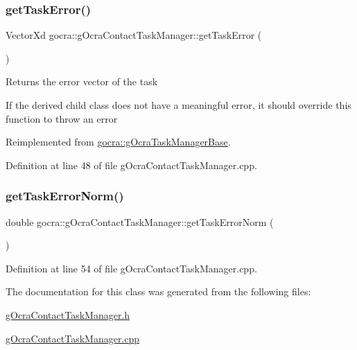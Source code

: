 \subsubsection{\texorpdfstring{get\+Task\+Error()}{getTaskError()}}
{\footnotesize\ttfamily Vector\+Xd gocra\+::g\+Ocra\+Contact\+Task\+Manager\+::get\+Task\+Error (\begin{DoxyParamCaption}{ }\end{DoxyParamCaption})\hspace{0.3cm}{\ttfamily [virtual]}}

Returns the error vector of the task

If the derived child class does not have a meaningful error, it should override this function to throw an error 

Reimplemented from \hyperlink{classgocra_1_1gOcraTaskManagerBase_a5c40a14b3a1d5a6519da422310d28f97}{gocra\+::g\+Ocra\+Task\+Manager\+Base}.



Definition at line 48 of file g\+Ocra\+Contact\+Task\+Manager.\+cpp.

\hypertarget{classgocra_1_1gOcraContactTaskManager_af7865eaf5c86bca10e8911a23cceaf2a}{}\label{classgocra_1_1gOcraContactTaskManager_af7865eaf5c86bca10e8911a23cceaf2a} 
\subsubsection{\texorpdfstring{get\+Task\+Error\+Norm()}{getTaskErrorNorm()}}
{\footnotesize\ttfamily double gocra\+::g\+Ocra\+Contact\+Task\+Manager\+::get\+Task\+Error\+Norm (\begin{DoxyParamCaption}{ }\end{DoxyParamCaption})}



Definition at line 54 of file g\+Ocra\+Contact\+Task\+Manager.\+cpp.



The documentation for this class was generated from the following files\+:\begin{DoxyCompactItemize}
\item 
\hyperlink{gOcraContactTaskManager_8h}{g\+Ocra\+Contact\+Task\+Manager.\+h}\item 
\hyperlink{gOcraContactTaskManager_8cpp}{g\+Ocra\+Contact\+Task\+Manager.\+cpp}\end{DoxyCompactItemize}
